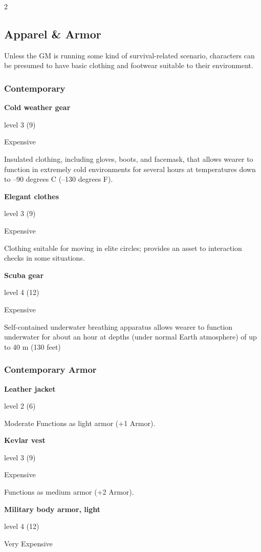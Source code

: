 \begin{multicols}{2}
\subsection{Apparel \& Armor}

Unless the GM is running some kind of survival-related scenario, characters can be presumed to have basic clothing and footwear suitable to their environment.

\subsubsection{Contemporary}

\textbf{Cold weather gear}

level 3 (9) 

Expensive 

Insulated clothing, including gloves, boots, and facemask, that allows wearer to function in extremely cold environments for several hours at temperatures down to –90 degrees C (–130 degrees F). 

\textbf{Elegant clothes}

level 3 (9) 

Expensive 

Clothing suitable for moving in elite circles; provides an asset to interaction checks in some situations. 

\textbf{Scuba gear}

level 4 (12)

Expensive 

Self-contained underwater breathing apparatus allows wearer to function underwater for about an hour at depths (under normal Earth atmosphere) of up to 40 m (130 feet)

\subsubsection{Contemporary Armor}

\textbf{Leather jacket}

level 2 (6) 

Moderate Functions as light armor (+1 Armor). 

\textbf{Kevlar vest}

level 3 (9) 

Expensive 

Functions as medium armor (+2 Armor). 

\textbf{Military body armor, light}

level 4 (12) 

Very Expensive 


\end{multicols}
